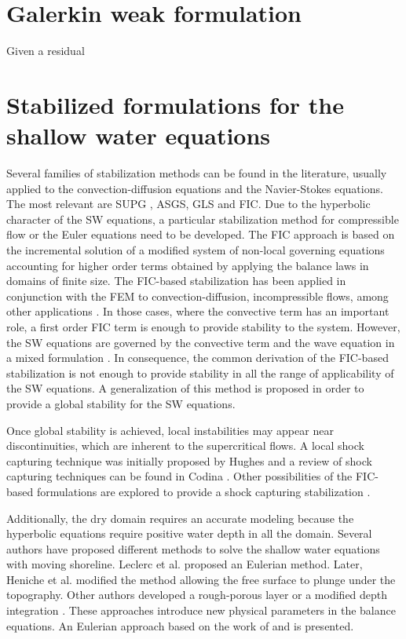 \section{Galerkin weak formulation}


Given a residual


\section{Stabilized formulations for the shallow water equations}


Several families of stabilization methods can be found in the literature, usually applied to the convection-diffusion equations and the Navier-Stokes equations. The most relevant are SUPG \cite{brooks1982},
ASGS\cite{codina1998}, GLS \cite{hughes1989} and FIC\cite{onate1996,onate1998}.
Due to the hyperbolic character of the SW equations, a particular stabilization method for compressible flow or the Euler equations need to be developed.
The FIC approach is based on the incremental solution of a modified system of non-local governing equations accounting for higher order terms obtained by applying the balance laws in domains of finite size.
The FIC-based stabilization has been applied in conjunction with the FEM to convection-diffusion, incompressible flows, among other applications \cite{onate1998,onate2001}.
In those cases, where the convective term has an important role, a first order FIC term is enough to provide stability to the system.
However, the SW equations are governed by the convective term and the wave equation in a mixed formulation \cite{codina2008}. In consequence, the common derivation of the FIC-based stabilization is not enough to provide stability in all the range of applicability of the SW equations. 
A generalization of this method is proposed in order to provide a global stability for the SW equations.

Once global stability is achieved, local instabilities may appear near discontinuities, which are inherent to the supercritical flows.
A local shock capturing technique was initially proposed by Hughes \cite{hughes1986} and a review of shock capturing techniques can be found in Codina \cite{codina2011}.
Other possibilities of the FIC-based formulations are explored to provide a shock capturing stabilization \cite{cotela2016}.

Additionally, the dry domain requires an accurate modeling because the hyperbolic equations require positive water depth in all the domain.
Several authors have proposed different methods to solve the shallow water equations with moving shoreline. Leclerc et al. \cite{leclerc1990} proposed an Eulerian method. Later, Heniche et al. \cite{heniche2000} modified the method allowing the free surface to plunge under the topography.
Other authors developed a rough-porous layer \cite{candy2017,barros2011} or a modified depth integration \cite{defina2000}. These approaches introduce new physical parameters in the balance equations.
An Eulerian approach based on the work of \cite{leclerc1990} and \cite{heniche2000} is presented.






